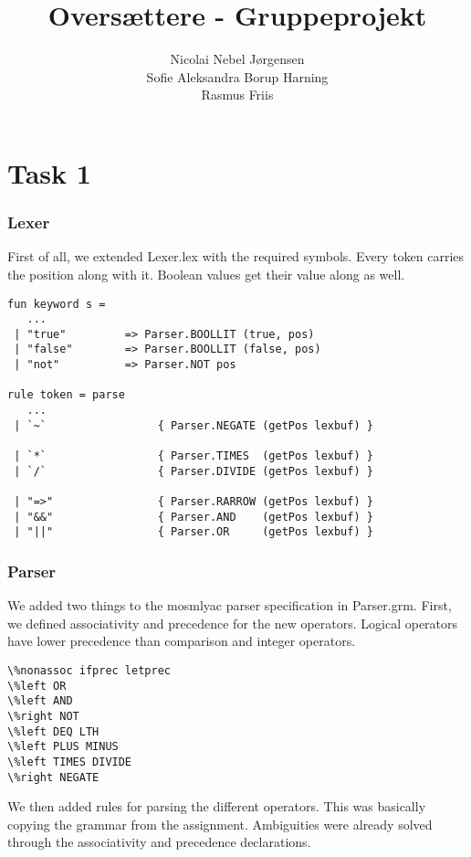 \documentclass[10pt]{article}
\begin{document}
\title{Oversættere - Gruppeprojekt}
\author{Nicolai Nebel Jørgensen\\
Sofie Aleksandra Borup Harning\\
Rasmus Friis}

\maketitle
\newpage
\section{Task 1}
\subsubsection{Lexer}
First of all, we extended Lexer.lex with the required symbols. Every token carries the position along with it. Boolean values get their value along as well.

\begin{Verbatim}[frame=single]
fun keyword s =
   ...
 | "true"         => Parser.BOOLLIT (true, pos)
 | "false"        => Parser.BOOLLIT (false, pos)
 | "not"          => Parser.NOT pos

rule token = parse
   ...
 | `~`                 { Parser.NEGATE (getPos lexbuf) }

 | `*`                 { Parser.TIMES  (getPos lexbuf) }
 | `/`                 { Parser.DIVIDE (getPos lexbuf) }

 | "=>"                { Parser.RARROW (getPos lexbuf) }
 | "&&"                { Parser.AND    (getPos lexbuf) }
 | "||"                { Parser.OR     (getPos lexbuf) }
\end{Verbatim}

\subsubsection{Parser}
We added two things to the mosmlyac parser specification in Parser.grm. First, we defined associativity and precedence for the new operators. Logical operators have lower precedence than comparison and integer operators.

\begin{Verbatim}[frame=single]
\%nonassoc ifprec letprec
\%left OR
\%left AND
\%right NOT
\%left DEQ LTH
\%left PLUS MINUS
\%left TIMES DIVIDE
\%right NEGATE
\end{Verbatim}

We then added rules for parsing the different operators. This was basically copying the grammar from the assignment. Ambiguities were already solved through the associativity and precedence declarations.
\end{document}
